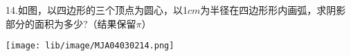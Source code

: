 14.如图，以四边形的三个顶点为圆心，以1$cm$为半径在四边形形内画弧，求阴影部分的面积为多少?（结果保留$\pi$）

\begin{flushright}

    \texttt{[image: lib/image/MJA04030214.png]}

\end{flushright}



